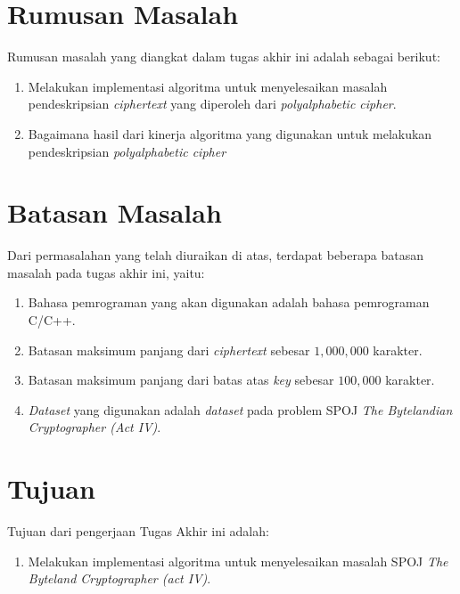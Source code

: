   \section{Rumusan Masalah}
    Rumusan masalah yang diangkat dalam tugas akhir ini adalah sebagai berikut: 
    \begin{enumerate}
      \item Melakukan implementasi algoritma untuk menyelesaikan masalah pendeskripsian \textit{ciphertext} yang diperoleh dari \textit{polyalphabetic cipher}.
      \item Bagaimana hasil dari kinerja algoritma yang digunakan untuk melakukan pendeskripsian \textit{polyalphabetic cipher} 
    \end{enumerate}

  \section{Batasan Masalah}
  	\label{batasan-masalah}
    Dari permasalahan yang telah diuraikan di atas, terdapat beberapa batasan masalah pada tugas akhir ini, yaitu:
    \begin{enumerate}
      \item Bahasa pemrograman yang akan digunakan adalah bahasa pemrograman C/C++.
      \item Batasan maksimum panjang dari \textit{ciphertext} sebesar $1,000,000$ karakter.	
      \item Batasan maksimum panjang dari batas atas \textit{key} sebesar $100,000$ karakter.
      \item \textit{Dataset} yang digunakan adalah \textit{dataset} pada problem SPOJ \textit{The Bytelandian Cryptographer (Act IV)}.
    \end{enumerate}

  \section{Tujuan}
  \label{tujuan}
    Tujuan dari pengerjaan Tugas Akhir ini adalah: 
    \begin{enumerate}
      \item Melakukan implementasi algoritma untuk menyelesaikan masalah SPOJ \textit{The Byteland Cryptographer (act IV)}.
    \end{enumerate}
    
    
